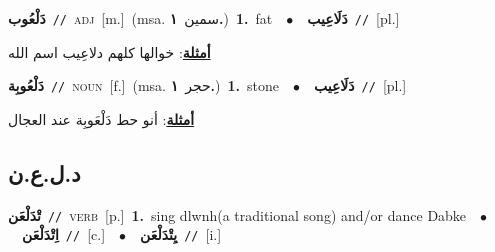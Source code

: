 \documentclass[10pt,a4paper,twoside]{article} %
\begin{document}
\begin{multicols}{2}
{\setlength\topsep{0pt}\textbf{\foreignlanguage{arabic}{دَلْعُوب}}\ {\color{gray}\texttt{//}\color{black}}\ \textsc{adj}\ [m.]\ \color{gray}(msa. \foreignlanguage{arabic}{سمين}~\foreignlanguage{arabic}{\textbf{١.}})\color{black}\ \textbf{1.}~fat\ \ $\bullet$\ \ \setlength\topsep{0pt}\textbf{\foreignlanguage{arabic}{دَلَاعِيب}}\ {\color{gray}\texttt{//}\color{black}}\ [pl.]\  \begin{flushright}\color{gray}\foreignlanguage{arabic}{\textbf{\underline{\foreignlanguage{arabic}{أمثلة}}}: خوالها كلهم دلاعِيب اسم الله}\end{flushright}\color{black}} \vspace{2mm}

{\setlength\topsep{0pt}\textbf{\foreignlanguage{arabic}{دَلْعُوبِة}}\ {\color{gray}\texttt{//}\color{black}}\ \textsc{noun}\ [f.]\ \color{gray}(msa. \foreignlanguage{arabic}{حجر}~\foreignlanguage{arabic}{\textbf{١.}})\color{black}\ \textbf{1.}~stone\ \ $\bullet$\ \ \setlength\topsep{0pt}\textbf{\foreignlanguage{arabic}{دَلَاعِيب}}\ {\color{gray}\texttt{//}\color{black}}\ [pl.]\  \begin{flushright}\color{gray}\foreignlanguage{arabic}{\textbf{\underline{\foreignlanguage{arabic}{أمثلة}}}: أنو حط دَلْعَوبِة عند العجال}\end{flushright}\color{black}} \vspace{2mm}

\vspace{-3mm}
\subsection*{\color{blue}\foreignlanguage{arabic}{د.ل.ع.ن}\color{blue}{}} 

{\setlength\topsep{0pt}\textbf{\foreignlanguage{arabic}{تْدَلْعَن}}\ {\color{gray}\texttt{//}\color{black}}\ \textsc{verb}\ [p.]\ \textbf{1.}~sing dlwnh(a traditional song) and/or dance Dabke\ \ $\bullet$\ \ \setlength\topsep{0pt}\textbf{\foreignlanguage{arabic}{اِتْدَلْعَن}}\ {\color{gray}\texttt{//}\color{black}}\ [c.]\ \ $\bullet$\ \ \setlength\topsep{0pt}\textbf{\foreignlanguage{arabic}{يِتْدَلْعَن}}\ {\color{gray}\texttt{//}\color{black}}\ [i.]\ } \vspace{2mm}


\end{multicols}
\end{document}
